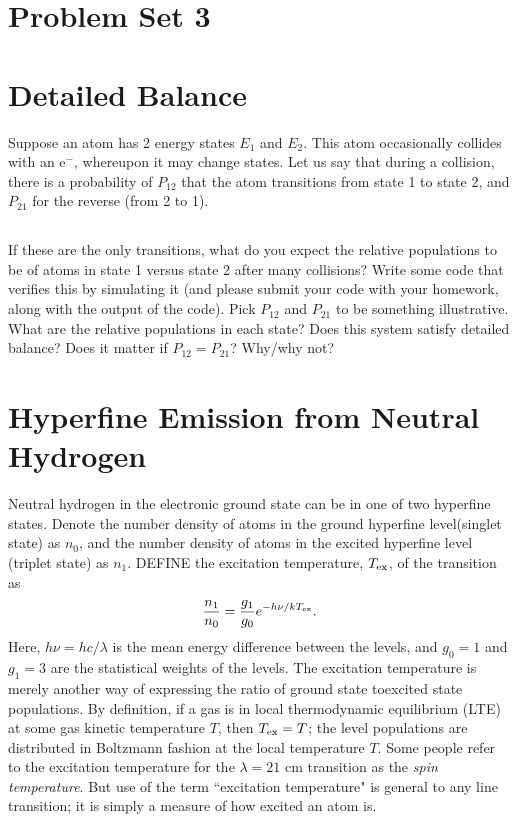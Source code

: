 \documentclass[11pt]{article}
\begin{document}
\pagestyle{empty}
\parindent=0pt

\section*{\centering Problem Set 3}


\section{Detailed Balance}

Suppose an atom has 2 energy states $E_1$ and $E_2$.  This atom occasionally
collides with an e$^-$, whereupon it may change states.  Let us say that
during a collision, there is a probability of $P_{12}$ that the atom transitions
from state 1 to state 2, and $P_{21}$ for the reverse (from 2 to 1).

\subsection{}
If these are the only transitions, what do you expect the relative populations
to be of atoms in state 1 versus state 2 after many collisions?  Write some
code that verifies this by simulating it (and please submit your code with your homework,
along with the output of the code).  Pick $P_{12}$ and $P_{21}$ to be something
illustrative.  What are the relative populations in each state?
Does this system satisfy detailed balance?  Does it matter if $P_{12}=P_{21}$?
Why/why not?

\def\Tex{{T_{\rm ex}}}
\section{Hyperfine Emission from Neutral Hydrogen}

Neutral hydrogen in the electronic ground state can be in one of two hyperfine
states. Denote the number density of atoms in the ground hyperfine level(singlet state) as $n_0$, and the number density of atoms in the excited hyperfine
level (triplet state) as $n_1$. DEFINE the excitation temperature, $\Tex$, of the
transition as
\begin{equation}
\frac{n_1}{n_0}=\frac{g_1}{g_0}e^{-h\nu/k\Tex}.
\end{equation}
Here, $h\nu=hc/\lambda$ is the mean energy difference between the levels, and
$g_0=1$ and $g_1=3$ are the statistical weights of the levels. The excitation
temperature is merely another way of expressing the ratio of ground state toexcited state populations. By definition, if a gas is in local thermodynamic
equilibrium (LTE) at some gas kinetic temperature $T$, then $\Tex = T$; the level
populations are distributed in Boltzmann fashion at the local temperature $T$.
Some people refer to the excitation temperature for the $\lambda = 21$ cm transition as
the {\it spin temperature}. But use of the term ``excitation temperature" is general
to any line transition; it is simply a measure of how excited an atom is.
\end{document}
